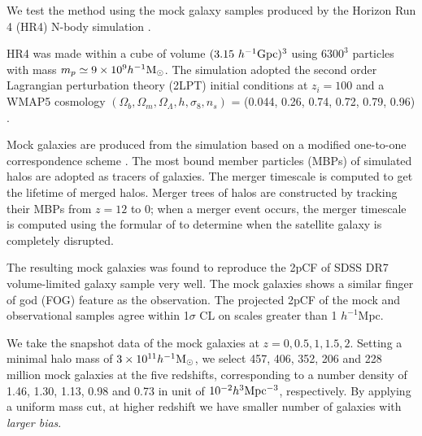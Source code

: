 \documentclass[iop]{emulateapj}
\newcommand{\hMsun}{{\ifmmode{h^{-1}{\rm
        {M_{\odot}}}}\else{$h^{-1}{\rm{M_{\odot}}}$~}\fi}}
\begin{document}
We test the method using the mock galaxy samples produced by the Horizon Run 4  (HR4) N-body simulation \citep{hr4,hong2016}.

HR4 was made within a cube of volume $({3.15}\ h^{-1}\rm Gpc)^3$ using  $6300^3$ particles with mass $m_p\simeq 9 \times 10^9 \hMsun$.
The simulation adopted the second order Lagrangian perturbation theory (2LPT) initial conditions at $z_{i}=100$
and a WMAP5 cosmology $(\Omega_{b},\Omega_{m},\Omega_\Lambda,h,\sigma_8,n_s)$  = (0.044, 0.26, 0.74, 0.72, 0.79, 0.96) \citep{komatsu 2011}.

Mock galaxies are produced from the simulation based on a modified one-to-one correspondence scheme \citep{hong2016}. 
The most bound member particles (MBPs) of simulated halos are adopted as tracers of galaxies.
The merger timescale is computed to get the lifetime of merged halos.
Merger trees of halos are constructed by tracking their MBPs from $z = 12$ to 0;
when a merger event occurs, the merger timescale is computed using the formular of \cite{jiang2008} to 
determine when the satellite galaxy is completely disrupted.

The resulting mock galaxies was found to reproduce the 2pCF of SDSS DR7 volume-limited galaxy sample \citep{zehavi2011} very well.
The mock galaxies shows a similar finger of god (FOG) feature \citep{FOG} as the observation.
The projected 2pCF of the mock and observational samples agree within 1$\sigma$ CL
on scales greater than 1 ${h^{-1}}$Mpc.

We take the snapshot data of the mock galaxies at $z=0,0.5,1,1.5,2$.
Setting a minimal halo mass of $3\times 10^{11} \hMsun$, 
we select 457, 406, 352, 206 and 228 million mock galaxies at the five redshifts,
corresponding to a number density of 
1.46, 1.30, 1.13, 0.98 and 0.73 in unit of $ 10^{-2} h^{3} \rm Mpc^{-3}$,
respectively.
By applying a uniform mass cut, at higher redshift we have smaller number of galaxies with {\it larger bias}.
\end{document}
